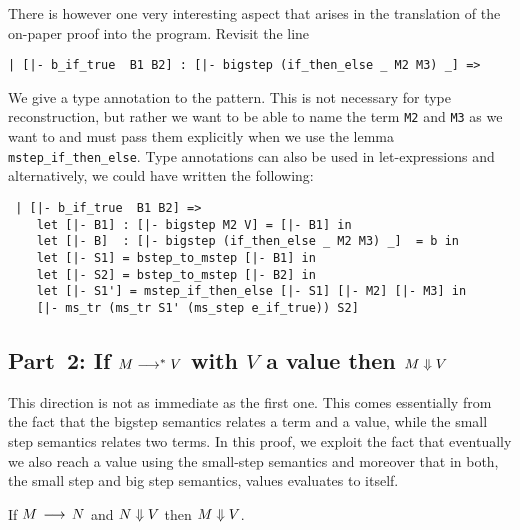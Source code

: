 There is however one very interesting aspect that arises in the
translation of the on-paper proof into the program. Revisit the line 

\begin{center}
\lstinline!| [|- b_if_true  B1 B2] : [|- bigstep (if_then_else _ M2 M3) _] =>!
\end{center}

We give a type annotation to the pattern. This is not necessary for
type reconstruction, but rather we want to be able to name the term
\lstinline!M2! and \lstinline!M3! as we want to and must pass them explicitly
when we use the lemma \lstinline!mstep_if_then_else!. Type annotations
can also be used in let-expressions and alternatively, we could have
written the following:

\begin{lstlisting}
 | [|- b_if_true  B1 B2] =>
    let [|- B1] : [|- bigstep M2 V] = [|- B1] in 
    let [|- B]  : [|- bigstep (if_then_else _ M2 M3) _]  = b in 
    let [|- S1] = bstep_to_mstep [|- B1] in
    let [|- S2] = bstep_to_mstep [|- B2] in
    let [|- S1'] = mstep_if_then_else [|- S1] [|- M2] [|- M3] in
    [|- ms_tr (ms_tr S1' (ms_step e_if_true)) S2]  
\end{lstlisting}



\subsection{Part~2: If $M \longrightarrow^* V$ with $V$ a value then $M \Downarrow V$ }

This direction is not as immediate as the first one. This comes essentially from
the fact that the bigstep semantics relates a term and a value, while the
small step semantics relates two terms. In this proof, we 
exploit the fact that eventually we also reach a value using the
small-step semantics and moreover that in both, the small step and big
step semantics, values evaluates to itself.


\begin{lemma}\label{lem:step-bstep-to-bstep}
  If $M \mathrel{\,\longrightarrow\,} N$ and $N \Downarrow V$ then $M \Downarrow V$.
\end{lemma}

